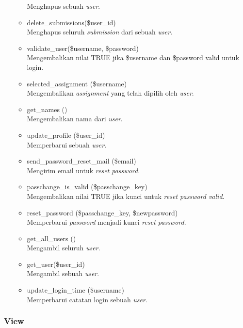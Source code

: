 \begin{itemize}
\begin{itemize}
 Menghapus sebuah \textit{user}.
    \item delete\_submissions(\$user\_id) \\
 Menghapus seluruh \textit{submission} dari sebuah \textit{user}.
    \item validate\_user(\$username, \$password)\\
 Mengembalikan nilai TRUE jika \$username dan \$password valid untuk login.
    \item selected\_assignment (\$username)\\
 Mengembalikan \textit{assignment} yang telah dipilih oleh \textit{user}.
    \item get\_names ()\\
 Mengembalikan nama dari \textit{user}.
    \item update\_profile (\$user\_id)\\
 Memperbarui sebuah \textit{user}.
    \item send\_password\_reset\_mail (\$email)\\
 Mengirim email untuk \textit{reset password}.
    \item passchange\_is\_valid (\$passchange\_key) \\
 Mengembalikan nilai TRUE jika kunci untuk \textit{reset password valid}.
    \item reset\_password (\$passchange\_key, \$newpassword)\\
 Memperbarui \textit{password} menjadi kunci \textit{reset password}.
    \item get\_all\_users ()\\
 Mengambil seluruh \textit{user}.
    \item get\_user(\$user\_id) \\
 Mengambil sebuah \textit{user}.
    \item update\_login\_time (\$username) \\
 Memperbarui catatan login sebuah \textit{user}.
    \end{itemize}
\end{itemize}

\subsubsection{View}

